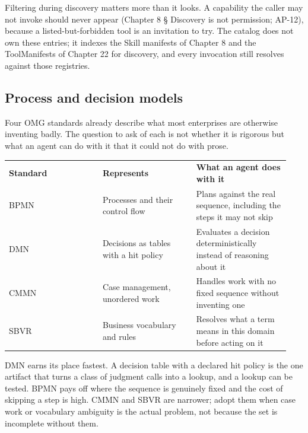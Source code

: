 Filtering during discovery matters more than it looks. A capability the caller may not invoke should never appear (Chapter 8 § Discovery is not permission; AP-12), because a listed-but-forbidden tool is an invitation to try. The catalog does not own these entries; it indexes the Skill manifests of Chapter 8 and the ToolManifests of Chapter 22 for discovery, and every invocation still resolves against those registries.\par

\subsection{Process and decision models}

Four OMG standards already describe what most enterprises are otherwise inventing badly. The question to ask of each is not whether it is rigorous but what an agent can do with it that it could not do with prose.\par

\BookTableStart
\small
\begin{tabular}{@{}Y{0.3133\linewidth}Y{0.3133\linewidth}Y{0.3133\linewidth}@{}}
\color{white}\bfseries Standard & \color{white}\bfseries Represents & \color{white}\bfseries What an agent does with it \\
BPMN  & Processes and their control flow & Plans against the real sequence, including the steps it may not skip \\
DMN  & Decisions as tables with a hit policy & Evaluates a decision deterministically instead of reasoning about it \\
CMMN  & Case management, unordered work & Handles work with no fixed sequence without inventing one \\
SBVR  & Business vocabulary and rules & Resolves what a term means in this domain before acting on it \\
\end{tabular}
\BookTableEnd

DMN earns its place fastest. A decision table with a declared hit policy is the one artifact that turns a class of judgment calls into a lookup, and a lookup can be tested. BPMN pays off where the sequence is genuinely fixed and the cost of skipping a step is high. CMMN and SBVR are narrower; adopt them when case work or vocabulary ambiguity is the actual problem, not because the set is incomplete without them.\par

